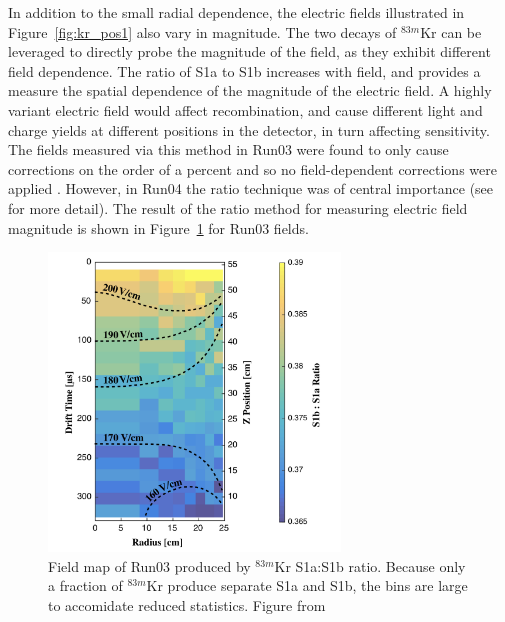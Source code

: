 In addition to the small radial dependence, the electric fields illustrated in Figure~\ref{fig:kr_pos1} also vary in magnitude. The two decays of $^{83m}$Kr can be leveraged to directly probe the magnitude of the field, as they exhibit different field dependence. The ratio of S1a to S1b increases with field, and provides a measure the spatial dependence of the magnitude of the electric field. A highly variant electric field would affect recombination, and cause different light and charge yields at different positions in the detector, in turn affecting sensitivity. The fields measured via this method in Run03 were found to only cause corrections on the order of a percent and so no field-dependent corrections were applied \cite{LUXKr}. However, in Run04 the ratio technique was of central importance (see \cite{LUXCombinedExposure} \cite{LUXFields} \cite{LUXKr} for more detail). The result of the ratio method for measuring electric field magnitude is shown in Figure~\ref{fig:kr_3} for Run03 fields.

\begin{figure}[htbp]
\begin{center}
\includegraphics[width=0.69\textwidth]{figures/lux/kr_3.png}
\caption{Field map of Run03 produced by $^{83m}$Kr S1a:S1b ratio. Because only a fraction of $^{83m}$Kr produce separate S1a and S1b, the bins are large to accomidate reduced statistics. Figure from \cite{LUXKr} }
\label{fig:kr_3}
\end{center}
\end{figure}

